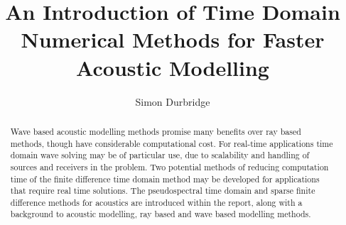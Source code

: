 \documentclass{svproc}
\title{An Introduction of Time Domain Numerical Methods for Faster Acoustic Modelling} %
\author{Simon Durbridge} %
\institute{Dept. Engineering, Mathematics \&\ Computing\\ University of Derby\\
\email{s.durbridge1@unimail.derby.ac.uk} %
} %
\begin{document}
\maketitle %


\begin{abstract}
Wave based acoustic modelling methods promise many benefits over ray based methods, though have considerable computational cost. For real-time applications time domain wave solving may be of particular use, due to scalability and handling of sources and receivers in the problem. Two potential methods of reducing computation time of the finite difference time domain method may be developed for applications that require real time solutions. The pseudospectral time domain and sparse finite difference methods for acoustics are introduced within the report, along with a background to acoustic modelling, ray based and wave based modelling methods. 


\end{abstract}









\end{document}
